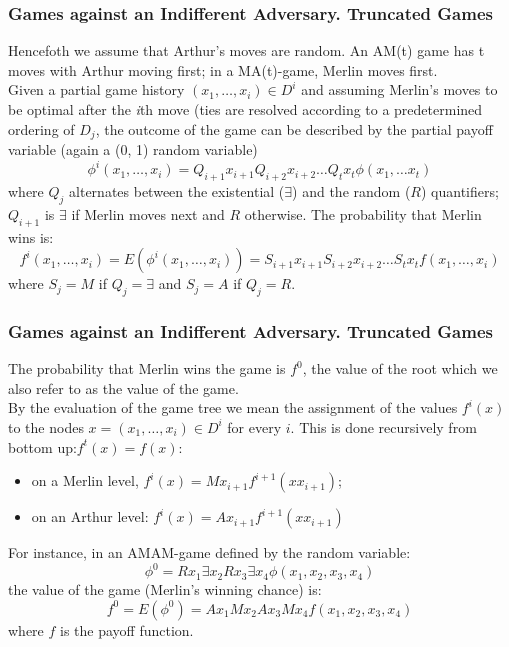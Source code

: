 \documentclass{beamer}
\begin{document}
\begin{frame}
\frametitle{Games against an Indifferent Adversary. Truncated Games}
Hencefoth we assume that Arthur's moves are random. An AM(t) game has t moves with Arthur moving first; in a MA(t)-game, Merlin moves first.\\
Given a partial game history $(x_1, \ldots, x_i) \in D^i$ and assuming Merlin's moves to be optimal after the \textit{i}th move (ties are resolved according to a predetermined ordering of $D_j$, the outcome of the game can be described by the partial payoff variable (again a (0, 1) random variable)
$$ \phi^i(x_1,\ldots,x_i) = Q_{i+1}x_{i+1}Q_{i+2}x_{i+2}\ldots Q_{t}x_{t} \phi(x_1,\ldots x_t)$$where $Q_j$ alternates between the existential ($\exists$) and the random ($R$) quantifiers; $Q_{i+1}$ is  $\exists$ if Merlin moves next and $R$ otherwise.
The probability that Merlin wins is: $$f^i (x_1,\ldots,x_i) = E(\phi^i (x_1,\ldots,x_i)) = S_{i+1}x_{i+1}S_{i+2}x_{i+2}\ldots S_t x_t f (x_1,\ldots,x_i)$$
where $S_j = M$ if $Q_j = \exists$ and $S_j = A$ if $Q_j = R$.
\end{frame}

\begin{frame}
\frametitle{Games against an Indifferent Adversary. Truncated Games}
The probability that Merlin wins the game is $f^0$, the value of the root which we also refer to as the value of the game.\\
By the evaluation of the game tree we mean the assignment of the values $f^i (x)$ to the nodes $x = (x_1,\ldots, x_i) \in D^i$ for every $i$. This is done recursively from bottom up:$f^t (x) = f(x)$:
\begin{itemize}
\item on a Merlin level, $f^i (x) = Mx_{i+1}f^{i+1}(xx_{i+1})$;
\item on an Arthur level: $f^i (x) = Ax_{i+1}f^{i+1}(xx_{i+1})$
\end{itemize}
For instance, in an AMAM-game defined by the random variable:
$$\phi^0 = Rx_1 \exists x_2 R x_3 \exists x_4 \phi(x_1, x_2, x_3, x_4)$$
the value of the game (Merlin's winning chance) is:
$$f^0 = E(\phi^0) = Ax_1 Mx_2 Ax_3 Mx_4 f(x_1, x_2, x_3, x_4)$$
where $f$ is the payoff function.
\end{frame}
\end{document}
